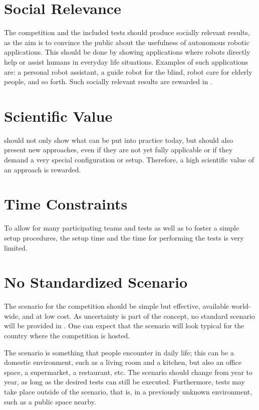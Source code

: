 \section{Social Relevance}
\label{concept:social_relevance}

The competition and the included tests should produce socially relevant results, as the aim is to convince the public about the usefulness of autonomous robotic applications.
This should be done by showing applications where robots directly help or assist humans in everyday life situations.
Examples of such applications are: a personal robot assistant, a guide robot for the blind, robot care for elderly people, and so forth.
Such socially relevant results are rewarded in \AtHome.

\section{Scientific Value}
\label{concept:scientific_value}

\AtHome{} should not only show what can be put into practice today, but should also present new approaches, even if they are not yet fully applicable or if they demand a very special configuration or setup.
Therefore, a high scientific value of an approach is rewarded.

\section{Time Constraints}
\label{concept:time_constraints}

To allow for many participating teams and tests as well as to foster a simple setup procedures, the setup time and the time for performing the tests is very limited.

\section{No Standardized Scenario}
\label{concept:no_standardized_scenario}

The scenario for the competition should be simple but effective, available world-wide, and at low cost.
As uncertainty is part of the concept, no standard scenario will be provided in \AtHome.
One can expect that the scenario will look typical for the country where the competition is hosted.

The scenario is something that people encounter in daily life; this can be a domestic environment, such as a living room and a kitchen, but also an office space, a supermarket, a restaurant, etc.
The scenario should change from year to year, as long as the desired tests can still be executed.
Furthermore, tests may take place outside of the scenario, that is, in a previously unknown environment, such as a public space nearby.

